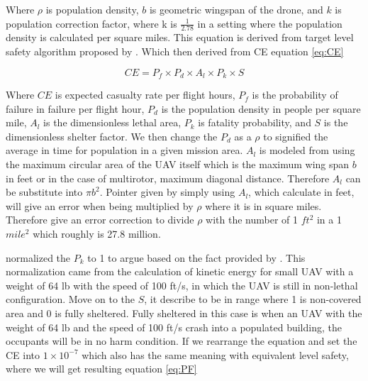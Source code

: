 \documentclass[12pt]{report}
\begin{document}
            Where \(\rho\) is population density, \(b\) is geometric wingspan of the drone, and \(k\) is population
            correction factor, where k is \(\frac{1}{2.78}\) in a setting where the population density is calculated per
            square miles. This equation is derived from target level safety algorithm proposed by
            \cite{burke_system-level_2011}. Which then derived from \ac{CE} equation \ref{eq:CE}

            \begin{equation}\label{eq:CE}
                CE = P_f \times P_d \times A_l \times P_k \times {S}
            \end{equation}

            Where \(CE\) is expected casualty rate per flight hours, \(P_f\) is the probability of failure in failure
            per flight hour, \(P_d\) is the population density in people per square mile, \(A_l\) is the dimensionless
            lethal area, \(P_k\) is fatality probability, and \(S\) is the dimensionless shelter factor. We then change
            the \(P_d\) as a \(\rho\) to signified the average in time for population in a given mission area. \(A_l\)
            is modeled from using the maximum circular area of the UAV itself which is the maximum wing span \(b\) in
            feet or in the case of multirotor, maximum diagonal distance. Therefore \(A_l\) can be substitute into \(\pi
            b^2\). Pointer given by \cite{burke_system-level_2011} simply using \(A_l\), which calculate in feet, will
            give an error when being multiplied by \(\rho\) where it is in square miles. Therefore
            \cite{burke_system-level_2011} give an error correction to divide \(\rho\) with the number of 1 \(ft^2\) in
            a 1 \(mile^2\) which roughly is 27.8 million. 

            \cite{burke_system-level_2011} normalized the \(P_k\) to 1 to argue based on the fact provided by
            \cite{arc_unmanned_2015}. This normalization came from the calculation of kinetic energy for small UAV with
            a weight of 64 lb with the speed of 100 ft/s, in which the UAV is still in non-lethal configuration. Move on
            to the \(S\), it describe to be in range where 1 is non-covered area and 0 is fully sheltered. Fully
            sheltered in this case is when an UAV with the weight of 64 lb and the speed of 100 ft/s crash into a
            populated building, the occupants will be in no harm condition. If we rearrange the equation and set the
            \ac{CE} into \(1 \times 10^{-7}\) which also has the same meaning with equivalent level safety, where we
            will get resulting equation \ref{eq:PF}
\end{document}
